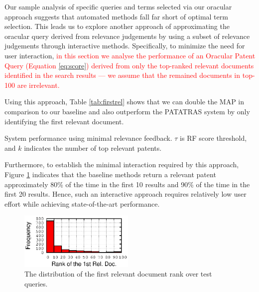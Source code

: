 Our sample analysis of specific queries and terms selected via our oracular
approach suggests that automated methods fall far short of optimal term selection.
This leads us to explore another approach of approximating the oracular query
derived from relevance judgements by using a subset of relevance judgements
through interactive methods.  Specifically, to minimize the need for user interaction,
\textcolor{red}{in this section we analyse the performance of an Oracular Patent Query (Equation \ref{eq:score}) derived from
only the top-ranked relevant documents identified in the search results --- we assume that the remained documents in top-100 are irrelevant.}

Using this approach, Table \ref{tab:firstrel} shows that we can double the MAP in comparison to our baseline and also outperform the PATATRAS system by only identifying the first relevant document.
\begin{table}[t!]
  \begin{center}
   \caption{System performance using minimal relevance feedback. $\tau$ is RF score threshold, and $k$ indicates the number of top relevant patents.}\vspace{3mm}
     
  \label{tab:firstrel}
  \end{center}  
\end{table}

Furthermore, to establish the minimal interaction required by this
approach, Figure \ref{fig:FirstTPRankHisto} indicates that the
baseline methods return a relevant patent approximately 80\% of the
time in the first 10 results and 90\% of the time in the first 20
results. Hence, such an interactive approach requires relatively low
user effort while achieving state-of-the-art performance.


\begin{figure}
\begin{centering}
\includegraphics[width=5.5cm]{imgs/1stRank}
\par\end{centering}

\protect\caption{The distribution of the first relevant document rank over test queries.}
\label{fig:FirstTPRankHisto}
\end{figure}


